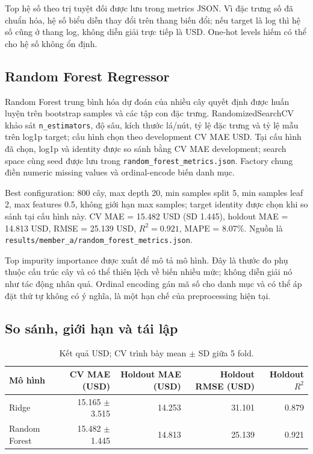 Top hệ số theo trị tuyệt đối được lưu trong metrics JSON. Vì đặc trưng số đã
chuẩn hóa, hệ số biểu diễn thay đổi trên thang biến đổi; nếu target là log thì
hệ số cũng ở thang log, không diễn giải trực tiếp là USD. One-hot levels hiếm có
thể cho hệ số không ổn định.

\subsection{Random Forest Regressor}

Random Forest trung bình hóa dự đoán của nhiều cây quyết định được huấn luyện
trên bootstrap samples và các tập con đặc trưng. RandomizedSearchCV khảo sát
\texttt{n\_estimators}, độ sâu, kích thước lá/nút, tỷ lệ đặc trưng và tỷ lệ mẫu
trên log1p target; cấu hình chọn theo development CV MAE USD. Tại cấu hình đã
chọn, log1p và identity được so sánh bằng CV MAE development; search space cùng
seed được lưu trong \texttt{random\_forest\_metrics.json}.
Factory chung điền numeric missing values và ordinal-encode biến danh mục.

Best configuration: 800 cây, max depth 20, min samples split 5, min samples leaf
2, max features 0.5, không giới hạn max samples; target identity được chọn khi
so sánh tại cấu hình này. CV MAE = 15.482 USD (SD 1.445), holdout MAE = 14.813
USD, RMSE = 25.139 USD, \(R^2=0.921\), MAPE = 8.07\%. Nguồn là
\texttt{results/member\_a/random\_forest\_metrics.json}.

Top impurity importance được xuất để mô tả mô hình. Đây là thước đo phụ thuộc
cấu trúc cây và có thể thiên lệch về biến nhiều mức; không diễn giải nó như tác
động nhân quả. Ordinal encoding gán mã số cho danh mục và có thể áp đặt thứ tự
không có ý nghĩa, là một hạn chế của preprocessing hiện tại.

\subsection{So sánh, giới hạn và tái lập}

\begin{table}[H]\centering
\begin{tabular}{lrrrr}
\toprule
Mô hình & CV MAE (USD) & Holdout MAE (USD) & Holdout RMSE (USD) & Holdout $R^2$ \\
\midrule
Ridge & 15.165 $\pm$ 3.515 & 14.253 & 31.101 & 0.879 \\
Random Forest & 15.482 $\pm$ 1.445 & 14.813 & 25.139 & 0.921 \\
\bottomrule
\end{tabular}
\caption{Kết quả USD; CV trình bày mean $\pm$ SD giữa 5 fold.}
\end{table}

